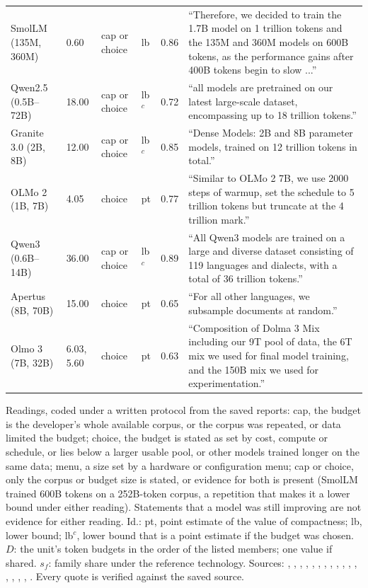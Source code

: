 \begin{table}[tp]
\begin{tabular}{@{}>{\raggedright\arraybackslash}p{2.5cm}lllr>{\raggedright\arraybackslash}p{4.8cm}@{}}
SmolLM (135M, 360M) & 0.60 & cap or choice & lb & 0.86 & ``Therefore, we decided to train the 1.7B model on 1 trillion tokens and the 135M and 360M models on 600B tokens, as the performance gains after 400B tokens begin to slow ...'' \\[2pt]
Qwen2.5 (0.5B--72B) & 18.00 & cap or choice & lb$^c$ & 0.72 & ``all models are pretrained on our latest large-scale dataset, encompassing up to 18 trillion tokens.'' \\[2pt]
Granite 3.0 (2B, 8B) & 12.00 & cap or choice & lb$^c$ & 0.85 & ``Dense Models: 2B and 8B parameter models, trained on 12 trillion tokens in total.'' \\[2pt]
OLMo 2 (1B, 7B) & 4.05 & choice & pt & 0.77 & ``Similar to OLMo 2 7B, we use 2000 steps of warmup, set the schedule to 5 trillion tokens but truncate at the 4 trillion mark.'' \\[2pt]
Qwen3 (0.6B--14B) & 36.00 & cap or choice & lb$^c$ & 0.89 & ``All Qwen3 models are trained on a large and diverse dataset consisting of 119 languages and dialects, with a total of 36 trillion tokens.'' \\[2pt]
Apertus (8B, 70B) & 15.00 & choice & pt & 0.65 & ``For all other languages, we subsample documents at random.'' \\[2pt]
Olmo 3 (7B, 32B) & 6.03, 5.60 & choice & pt & 0.63 & ``Composition of Dolma 3 Mix including our 9T pool of data, the 6T mix we used for final model training, and the 150B mix we used for experimentation.'' \\[2pt]
\bottomrule
\end{tabular}
\medskip
\begin{tablenotes}
Readings, coded under a written protocol from the saved reports: cap, the budget is the developer's whole available corpus, or the corpus was repeated, or data limited the budget; choice, the budget is stated as set by cost, compute or schedule, or lies below a larger usable pool, or other models trained longer on the same data; menu, a size set by a hardware or configuration menu; cap or choice, only the corpus or budget size is stated, or evidence for both is present (SmolLM trained 600B tokens on a 252B-token corpus, a repetition that makes it a lower bound under either reading). Statements that a model was still improving are not evidence for either reading. Id.: pt, point estimate of the value of compactness; lb, lower bound; lb$^c$, lower bound that is a point estimate if the budget was chosen. $D$: the unit's token budgets in the order of the listed members; one value if shared. $s_f$: family share under the reference technology. Sources: \citet{touvron2023llama}, \citet{touvron2023llama}, \citet{touvron2023llama2}, \citet{mosaicml2023mpt7b,mosaicml2023mpt30b}, \citet{stability2023stablelm}, \citet{bai2023qwen}, \citet{young2024yi}, \citet{bi2024deepseek}, \citet{grattafiori2024llama,meta2024llama3}, \citet{yang2024qwen2}, \citet{allal2024smollm}, \citet{qwen2024qwen25}, \citet{granite2024granite}, \citet{teamolmo2024olmo}, \citet{yang2025qwen3}, \citet{apertus2025apertus}, \citet{olmo2025olmo3}. Every quote is verified against the saved source.

\end{tablenotes}
\end{table}
